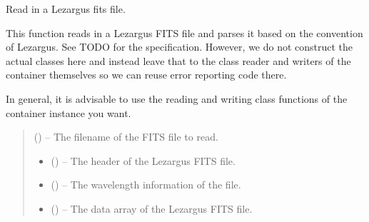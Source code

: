 \documentclass[letterpaper,11pt,english]{sphinxmanual}
\begin{document}
\begin{savenotes}
\begin{fulllineitems}
{{\begin{footnote}[99]\sphinxAtStartFootnote
{}
%
\end{footnote}%
\begin{footnote}[100]\sphinxAtStartFootnote
{}
%
\end{footnote}%
\begin{footnote}[101]\sphinxAtStartFootnote
{}
%
\end{footnote}\DUrole{p,p}{{]}}}}
\pysigstopsignatures
\sphinxAtStartPar
Read in a Lezargus fits file.

\sphinxAtStartPar
This function reads in a Lezargus FITS file and parses it based on the
convention of Lezargus. See TODO for the specification. However, we do
not construct the actual classes here and instead leave that to the class
reader and writers of the container themselves so we can reuse error
reporting code there.

\sphinxAtStartPar
In general, it is advisable to use the reading and writing class
functions of the container instance you want.
\begin{quote}\begin{description}
\sphinxAtStartPar
{} () – The filename of the FITS file to read.

\sphinxAtStartPar
\begin{itemize}
\item {} 
\sphinxAtStartPar
{} () – The header of the Lezargus FITS file.

\item {} 
\sphinxAtStartPar
{} () – The wavelength information of the file.

\item {} 
\sphinxAtStartPar
{} () – The data array of the Lezargus FITS file.


\end{itemize}
\end{description}
\end{quote}
\end{fulllineitems}
\end{savenotes}
\end{document}
